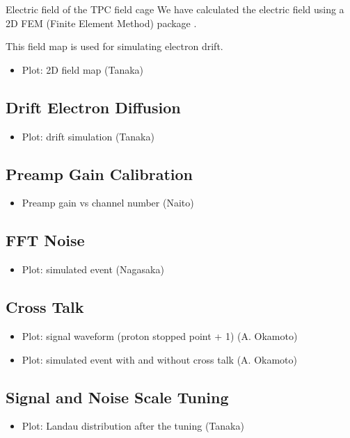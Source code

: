 \documentclass{cernyrep}
\begin{document}
Electric field of the TPC field cage
We have calculated the electric field using a 2D FEM (Finite Element Method) package \cite{Ref:FEMTET}.

This field map is used for simulating electron drift.


\begin{itemize}
\item Plot: 2D field map  (Tanaka)
\end{itemize}

\subsection{Drift Electron Diffusion}
\begin{itemize}
\item Plot: drift simulation  (Tanaka)
\end{itemize}

\subsection{Preamp Gain Calibration}
\begin{itemize}
\item Preamp gain vs channel number  (Naito)
\end{itemize}

\subsection{FFT Noise}
\begin{itemize}
\item Plot: simulated event  (Nagasaka)
\end{itemize}

\subsection{Cross Talk}
\begin{itemize}
\item Plot: signal waveform (proton stopped point + 1)  (A. Okamoto)
\item Plot: simulated event with and without cross talk (A. Okamoto)
\end{itemize}

\subsection{Signal and Noise Scale Tuning}
\begin{itemize}
\item Plot: Landau distribution after the tuning  (Tanaka)
\end{itemize}
\end{document}
